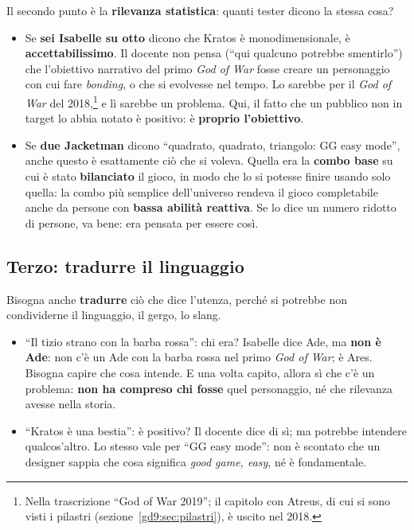 Il secondo punto è la \textbf{rilevanza statistica}: quanti tester dicono la
stessa cosa?
\begin{itemize}
  \item Se \textbf{sei Isabelle su otto} dicono che Kratos è
        monodimensionale, è \textbf{accettabilissimo}. Il docente non pensa
        (``qui qualcuno potrebbe smentirlo'') che l'obiettivo narrativo del
        primo \emph{God of War} fosse creare un personaggio con cui fare
        \emph{bonding}, o che si evolvesse nel tempo. Lo sarebbe per il
        \emph{God of War} del 2018,\footnote{Nella trascrizione ``God of
        War 2019''; il capitolo con Atreus, di cui si sono visti i pilastri
        (sezione~\ref{gd9:sec:pilastri}), è uscito nel 2018.} e lì sarebbe
        un problema. Qui, il fatto che un pubblico non in target lo abbia
        notato è positivo: è \textbf{proprio l'obiettivo}.
  \item Se \textbf{due Jacketman} dicono ``quadrato, quadrato, triangolo: GG
        easy mode'', anche questo è esattamente ciò che si voleva. Quella
        era la \textbf{combo base} su cui è stato \textbf{bilanciato} il
        gioco, in modo che lo si potesse finire usando solo quella: la combo
        più semplice dell'universo rendeva il gioco completabile anche da
        persone con \textbf{bassa abilità reattiva}. Se lo dice un numero
        ridotto di persone, va bene: era pensata per essere così.
\end{itemize}

\subsection{Terzo: tradurre il linguaggio}

Bisogna anche \textbf{tradurre} ciò che dice l'utenza, perché si potrebbe non
condividerne il linguaggio, il gergo, lo slang.
\begin{itemize}
  \item ``Il tizio strano con la barba rossa'': chi era? Isabelle dice Ade,
        ma \textbf{non è Ade}: non c'è un Ade con la barba rossa nel primo
        \emph{God of War}; è Ares. Bisogna capire che cosa intende. E una
        volta capito, allora sì che c'è un problema: \textbf{non ha
        compreso chi fosse} quel personaggio, né che rilevanza avesse nella
        storia.
  \item ``Kratos è una bestia'': è positivo? Il docente dice di sì; ma
        potrebbe intendere qualcos'altro. Lo stesso vale per ``GG easy
        mode'': non è scontato che un designer sappia che cosa significa
        \emph{good game, easy}, né è fondamentale.
\end{itemize}

